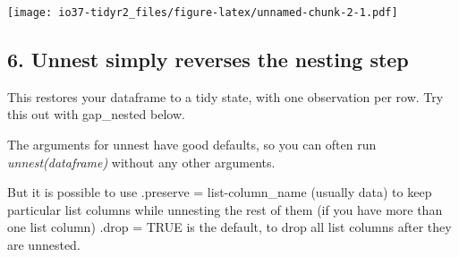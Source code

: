 \documentclass[
]{book}
\newenvironment{Shaded}{\begin{snugshade}}{\end{snugshade}}
\newcommand{\DataTypeTok}[1]{\textcolor[rgb]{0.13,0.29,0.53}{#1}}
\newcommand{\KeywordTok}[1]{\textcolor[rgb]{0.13,0.29,0.53}{\textbf{#1}}}
\newcommand{\NormalTok}[1]{#1}
\newcommand{\OperatorTok}[1]{\textcolor[rgb]{0.81,0.36,0.00}{\textbf{#1}}}
\newcommand{\StringTok}[1]{\textcolor[rgb]{0.31,0.60,0.02}{#1}}
\begin{document}
\begin{Shaded}
\end{Shaded}

\texttt{[image: io37-tidyr2\_files/figure-latex/unnamed-chunk-2-1.pdf]}

\hypertarget{unnest-simply-reverses-the-nesting-step}{%
\subsection{6. Unnest simply reverses the nesting step}\label{unnest-simply-reverses-the-nesting-step}}

This restores your dataframe to a tidy state, with one observation per row.
Try this out with gap\_nested below.

The arguments for unnest have good defaults, so you can often run \emph{unnest(dataframe)} without any other arguments.

But it is possible to use
.preserve = list-column\_name (usually data) to keep particular list columns while unnesting the rest of them (if you have more than one list column)
.drop = TRUE is the default, to drop all list columns after they are unnested.
\end{document}
